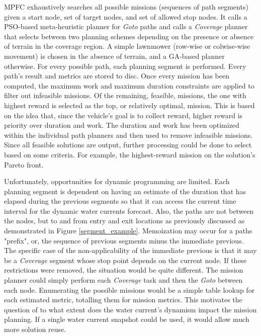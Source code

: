 \documentclass{tamuccthesis}
\begin{document}
MPFC exhaustively searches all possible missions (sequences of path segments) given a start node, set of target nodes, and set of allowed stop nodes. It calls a PSO-based meta-heuristic planner for \textit{Goto} paths and calls a \textit{Coverage} planner that selects between two planning schemes depending on the presence or absence of terrain in the coverage region. A simple lawnmower (row-wise or colwise-wise movement) is chosen in the absence of terrain, and a GA-based planner otherwise. For every possible path, each planning segment is performed. Every path's result and metrics are stored to disc. Once every mission has been computed, the maximum work and maximum duration constraints are applied to filter out infeasible missions. Of the remaining, feasible, missions, the one with highest reward is selected as the top, or relatively optimal, mission. This is based on the idea that, since the vehicle's goal is to collect reward, higher reward is priority over duration and work. The duration and work has been optimized within the individual path planners and then used to remove infeasible missions. Since all feasible solutions are output, further processing could be done to select based on some criteria. For example, the highest-reward mission on the solution's Pareto front.

Unfortunately, opportunities for dynamic programming are limited. Each planning segment is dependent on having an estimate of the duration that has elapsed during the previous segments so that it can access the current time interval for the dynamic water currents forecast. Also, the paths are not between the nodes, but to and from entry and exit locations as previously discussed as demonstrated in Figure \ref{segment_example}. Memoization may occur for a paths "prefix", or, the sequence of previous segments minus the immediate previous. The specific case of the non-applicability of the immediate previous is that it may be a \textit{Coverage} segment whose stop point depends on the current node. If these restrictions were removed, the situation would be quite different. The mission planner could simply perform each \textit{Coverage} task and then the \textit{Goto} between each node. Enumerating the possible missions would be a simple table lookup for each estimated metric, totalling them for mission metrics. This motivates the question of to what extent does the water current's dynamism impact the mission planning. If a single water current snapshot could be used, it would allow much more solution reuse. 
\end{document}
